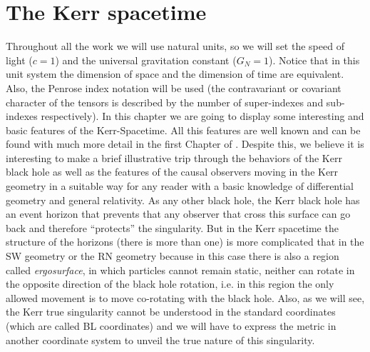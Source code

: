 \chapter{The Kerr spacetime}\label{ch:KerrG}

Throughout all the work we will use natural units, so we will set the speed of light ($c=1$) and the universal gravitation constant ($G_N=1$). Notice that in this unit system the dimension of space and the dimension of time are equivalent. Also, the Penrose index notation will be used (the contravariant or covariant character of the tensors is described by the number of super-indexes and sub-indexes respectively). In this chapter we are going to display some interesting and basic features of the Kerr-Spacetime. All this features are well known and can be found with much more detail in the first Chapter of \cite{o1995geometry}. Despite this, we believe it is interesting to make a brief illustrative trip through the behaviors of the Kerr black hole as well as the features of the causal observers moving in the Kerr geometry in a suitable way for any reader with a basic knowledge of differential geometry and general relativity. As any other black hole, the Kerr black hole has an event horizon that prevents that any observer that cross this surface can go back and therefore ``protects'' the singularity. But in the Kerr spacetime the structure of the horizons (there is more than one) is more complicated that in the \gls{SW} geometry or the \gls{RN} geometry because in this case there is also a region called \textit{ergosurface}, in which particles cannot remain static, neither can rotate in the opposite direction of the black hole rotation, i.e. in this region the only allowed movement is to move co-rotating with the black hole. Also, as we will see, the Kerr true singularity cannot be understood in the standard coordinates (which are called \gls{BL} coordinates) and we will have to express the metric in another coordinate system to unveil the true nature of this singularity.

